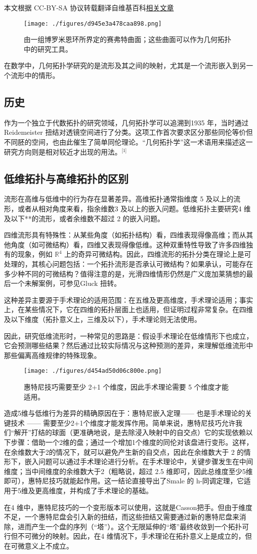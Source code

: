 
本文根据 CC-BY-SA 协议转载翻译自维基百科\href{https://en.wikipedia.org/wiki/Geometric_topology}{相关文章}

\begin{figure}[ht]
\centering
\texttt{[image: ./figures/d945e3a478caa898.png]}
\caption{由一组博罗米恩环所界定的赛弗特曲面；这些曲面可以作为几何拓扑中的研究工具。} \label{fig_JHtpx_1}
\end{figure}
在数学中，几何拓扑学研究的是流形及其之间的映射，尤其是一个流形嵌入到另一个流形中的情形。
\subsection{历史}
作为一个独立于代数拓扑的研究领域，几何拓扑学可以追溯到1935 年，当时通过Reidemeister 扭结对透镜空间进行了分类。这项工作首次要求区分那些同伦等价但不同胚的空间，也由此催生了简单同伦理论。“几何拓扑学”这一术语用来描述这一研究方向则是相对较近才出现的用法。\(^\text{[1]}\)
\subsection{低维拓扑与高维拓扑的区别}
流形在高维与低维中的行为存在显著差异。高维拓扑通常指维度 5 及以上的流形，或者从相对角度来看，指余维数3 及以上的嵌入问题。低维拓扑主要研究4 维及以下**的流形，或者余维数不超过 2 的嵌入问题。


四维流形具有特殊性：从某些角度（如拓扑结构）看，四维表现得像高维；而从其他角度（如可微结构）看，四维又表现得像低维。这种双重特性导致了许多四维独有的现象，例如 $\mathbb{R}^4$ 上的奇异可微结构。因此，四维流形的拓扑分类在理论上是可处理的，其核心问题包括：一个拓扑流形是否承认可微结构？如果承认，可能存在多少种不同的可微结构？值得注意的是，光滑四维情形仍然是广义庞加莱猜想的最后一个未解案例，可参见Gluck 扭转。

这种差异主要源于手术理论的适用范围：在五维及更高维度，手术理论适用；事实上，在某些情况下，它在四维的拓扑层面上也适用，但证明过程非常复杂。在四维及以下维度（拓扑意义上，三维及以下），手术理论则无法使用。

因此，研究低维流形时，一种常见的思路是：假设手术理论在低维情形下也成立，它会预测哪些结果？然后通过比较实际情况与这种预测的差异，来理解低维流形中那些偏离高维规律的特殊现象。
\begin{figure}[ht]
\centering
\texttt{[image: ./figures/d454ad50d06c800e.png]}
\caption{惠特尼技巧需要至少 2+1 个维度，因此手术理论需要 5 个维度才能适用。} \label{fig_JHtpx_2}
\end{figure}
造成5维与低维行为差异的精确原因在于：惠特尼嵌入定理—— 也是手术理论的关键技术 —— 需要至少2+1个维度才能发挥作用。简单来说，惠特尼技巧允许我们“解开”打结的球面（更准确地说，是去除浸入映射中的自交点）它的实现依赖以下步骤：借助一个2维的盘；通过一个增加1个维度的同伦对该盘进行变形。这样，在余维数大于2的情况下，就可以避免产生新的自交点，因此在余维数大于 2 的情形下，嵌入问题可以通过手术理论进行分析。在手术理论中，关键步骤发生在中间维度；当中间维度的余维数大于2（粗略说，超过 2.5 维即可，因此总维度至少5维即可），惠特尼技巧就能起作用。这一结论直接导出了Smale 的 h-同调定理，它适用于5维及更高维度，并构成了手术理论的基础。

在4 维中，惠特尼技巧的一个变形版本可以使用，这就是Casson把手。但由于维度不足，一个惠特尼盘会引入新的扭结，而这些扭结又需要通过新的惠特尼盘来消除，进而产生一个盘的序列（“塔”）。这个无限延伸的“塔”最终收敛到一个拓扑可行但不可微分的映射。因此，在4 维情况下，手术理论在拓扑意义上是成立的，但在可微意义上不成立。
